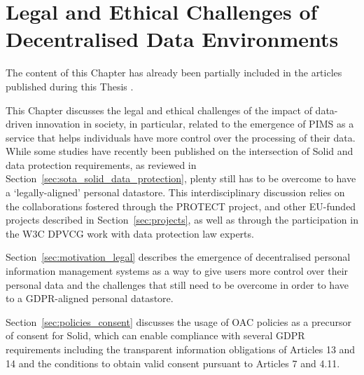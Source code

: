 \chapter{Legal and Ethical Challenges of Decentralised Data Environments}
\label{chap:legal}

\begin{tcolorbox}[colback=royallavender!40]
The content of this Chapter has already been partially included in the articles published during this Thesis \citep{esteves_fostering_2022,asgarinia_who_2023,florea_is_2023}.
\end{tcolorbox}

This Chapter discusses the legal and ethical challenges of the impact of data-driven innovation in society, in particular, related to the emergence of PIMS as a service that helps individuals have more control over the processing of their data.
While some studies have recently been published on the intersection of Solid and data protection requirements, as reviewed in Section~\ref{sec:sota_solid_data_protection}, plenty still has to be overcome to have a `legally-aligned' personal datastore.
This interdisciplinary discussion relies on the collaborations fostered through the PROTECT project, and other EU-funded projects described in Section~\ref{sec:projects}, as well as through the participation in the W3C DPVCG work with data protection law experts.

Section~\ref{sec:motivation_legal} describes the emergence of decentralised personal information management systems as a way to give users more control over their personal data and the challenges that still need to be overcome in order to have to a GDPR-aligned personal datastore.

Section~\ref{sec:policies_consent} discusses the usage of OAC policies as a precursor of consent for Solid, which can enable compliance with several GDPR requirements including the transparent information obligations of Articles 13 and 14 and the conditions to obtain valid consent pursuant to Articles 7 and 4.11.



% 
% 
% 
